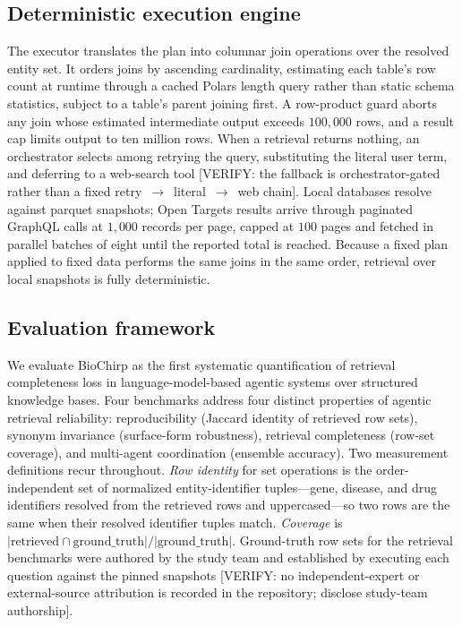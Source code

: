 \subsection*{Deterministic execution engine}

The executor translates the plan into columnar join operations over the resolved entity set. It orders joins by ascending cardinality, estimating each table's row count at runtime through a cached Polars length query rather than static schema statistics, subject to a table's parent joining first. A row-product guard aborts any join whose estimated intermediate output exceeds $100{,}000$ rows, and a result cap limits output to ten million rows. When a retrieval returns nothing, an orchestrator selects among retrying the query, substituting the literal user term, and deferring to a web-search tool [VERIFY: the fallback is orchestrator-gated rather than a fixed retry~$\rightarrow$~literal~$\rightarrow$~web chain]. Local databases resolve against parquet snapshots; Open Targets results arrive through paginated GraphQL calls at $1{,}000$ records per page, capped at $100$ pages and fetched in parallel batches of eight until the reported total is reached. Because a fixed plan applied to fixed data performs the same joins in the same order, retrieval over local snapshots is fully deterministic.

\subsection*{Evaluation framework}

We evaluate BioChirp as the first systematic quantification of retrieval completeness loss in language-model-based agentic systems over structured knowledge bases. Four benchmarks address four distinct properties of agentic retrieval reliability: reproducibility (Jaccard identity of retrieved row sets), synonym invariance (surface-form robustness), retrieval completeness (row-set coverage), and multi-agent coordination (ensemble accuracy). Two measurement definitions recur throughout. \emph{Row identity} for set operations is the order-independent set of normalized entity-identifier tuples---gene, disease, and drug identifiers resolved from the retrieved rows and uppercased---so two rows are the same when their resolved identifier tuples match. \emph{Coverage} is $|\text{retrieved} \cap \text{ground\_truth}| / |\text{ground\_truth}|$. Ground-truth row sets for the retrieval benchmarks were authored by the study team and established by executing each question against the pinned snapshots [VERIFY: no independent-expert or external-source attribution is recorded in the repository; disclose study-team authorship].

